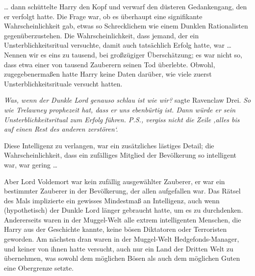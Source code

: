 … dann schüttelte Harry den Kopf und verwarf den düsteren Gedankengang, den er verfolgt hatte. Die Frage war, ob es überhaupt eine signifikante Wahrscheinlichkeit gab, etwas so Schrecklichem wie einem Dunklen Rationalisten gegenüberzustehen. Die Wahrscheinlichkeit, dass jemand, der ein Unsterblichkeitsritual versuchte, damit auch tatsächlich Erfolg hatte, war … Nennen wir es eins zu tausend, bei großzügiger Überschätzung; es war nicht so, dass etwa einer von tausend Zauberern seinen Tod überlebte. Obwohl, zugegebenermaßen hatte Harry keine Daten darüber, wie viele zuerst Unsterblichkeitsrituale versucht hatten.

\emph{Was, wenn der Dunkle Lord genauso schlau ist wie wir?} sagte Ravenclaw Drei. \emph{So wie Trelawney prophezeit hat, dass er uns ebenbürtig ist. Dann würde er sein Unsterblichkeitsritual zum Erfolg führen. P.S., vergiss nicht die Zeile ‚alles bis auf einen Rest des anderen zerstören‘.}

Diese Intelligenz zu verlangen, war ein zusätzliches lästiges Detail; die Wahrscheinlichkeit, dass ein zufälliges Mitglied der Bevölkerung so intelligent war, war gering …

Aber Lord Voldemort war kein zufällig ausgewählter Zauberer, er war ein bestimmter Zauberer in der Bevölkerung, der allen aufgefallen war. Das Rätsel des Mals implizierte ein gewisses Mindestmaß an Intelligenz, auch wenn (hypothetisch) der Dunkle Lord länger gebraucht hatte, um es zu durchdenken. Andererseits waren in der Muggel-Welt alle extrem intelligenten Menschen, die Harry aus der Geschichte kannte, keine bösen Diktatoren oder Terroristen geworden. Am nächsten dran waren in der Muggel-Welt Hedgefonds-Manager, und keiner von ihnen hatte versucht, auch nur ein Land der Dritten Welt zu übernehmen, was sowohl dem möglichen Bösen als auch dem möglichen Guten eine Obergrenze setzte.

